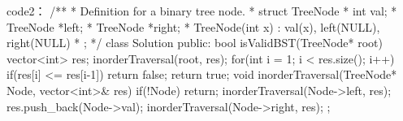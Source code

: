 code2：
/**
 * Definition for a binary tree node.
 * struct TreeNode {
 *     int val;
 *     TreeNode *left;
 *     TreeNode *right;
 *     TreeNode(int x) : val(x), left(NULL), right(NULL) {}
 * };
 */
class Solution {
public:
    bool isValidBST(TreeNode* root) {
        vector<int> res;
        inorderTraversal(root, res);
        for(int i = 1; i < res.size(); i++)
        {
            if(res[i] <= res[i-1]) return false;
        }
        return true;
    }
    void inorderTraversal(TreeNode* Node, vector<int>& res)
    {
        if(!Node) return;
        inorderTraversal(Node->left, res);
        res.push_back(Node->val);
        inorderTraversal(Node->right, res);
    }
};